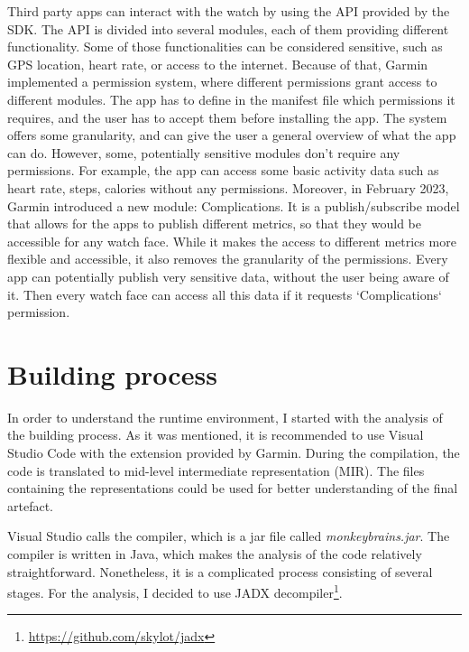 Third party apps can interact with the watch by using the API provided by the SDK.
The API is divided into several modules, each of them providing different functionality.
Some of those functionalities can be considered sensitive, such as GPS location, heart rate, or access to the internet.
Because of that, Garmin implemented a permission system, where different permissions grant access to different modules.
The app has to define in the manifest file which permissions it requires, and the user has to accept them before installing the app.
The system offers some granularity, and can give the user a general overview of what the app can do.
However, some, potentially sensitive modules don't require any permissions.
For example, the app can access some basic activity data such as heart rate, steps, calories without any permissions.
Moreover, in February 2023, Garmin introduced a new module: Complications.
It is a publish/subscribe model that allows for the apps to publish different metrics, so that they would be accessible for any watch face.
While it makes the access to different metrics more flexible and accessible, it also removes the granularity of the permissions.
Every app can potentially publish very sensitive data, without the user being aware of it.
Then every watch face can access all this data if it requests `Complications` permission.

\section{Building process}
In order to understand the runtime environment, I started with the analysis of the building process.
As it was mentioned, it is recommended to use Visual Studio Code with the extension provided by Garmin.
During the compilation, the code is translated to mid-level intermediate representation (MIR).
The files containing the representations could be used for better understanding of the final artefact.

Visual Studio calls the compiler, which is a jar file called \textit{monkeybrains.jar}.
The compiler is written in Java, which makes the analysis of the code relatively straightforward.
Nonetheless, it is a complicated process consisting of several stages.
For the analysis, I decided to use JADX decompiler\footnote{\url{https://github.com/skylot/jadx}}.

